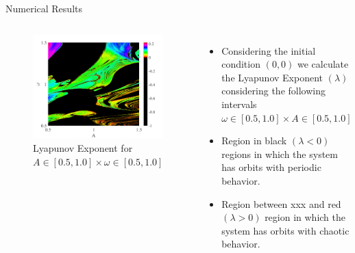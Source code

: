 \documentclass[
	10pt,aspectratio=169 %
]{beamer}
\begin{document}
\begin{frame}{Numerical Results}
   \transwipe
\begin{columns}
    \begin{figure}
    \centering
    \includegraphics[scale=0.3]{Imagens/Lyapunov2D.png}
    \caption{Lyapunov Exponent for $A \in [0.5, 1.0] \times \omega \in [0.5, 1.0]$}
    \label{fig:fig03}
    \end{figure} 
    \begin{itemize}
    \item Considering the initial condition $(0,0)$ we calculate the Lyapunov Exponent $(\lambda)$ considering the following intervals $\omega \in [0.5,1.0] \times A \in[0.5, 1.0]$
         \item Region in black $(\lambda<0)$ regions in which the system has orbits with periodic behavior.
         \item Region between xxx and red $(\lambda>0)$ region in which the system has orbits with chaotic behavior.
    \end{itemize}
\end{columns}
\end{frame}
\end{document}
